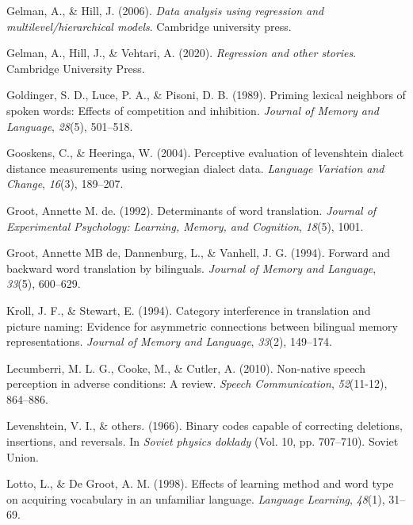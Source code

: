\documentclass[
  english,
  man,floatsintext]{apa6}
\newlength{\cslhangindent}
\newenvironment{CSLReferences}[2] %
 {%
  \setlength{\parindent}{0pt}
  \ifodd #1 \everypar{\setlength{\hangindent}{\cslhangindent}}\ignorespaces\fi
  \ifnum #2 > 0
  \setlength{\parskip}{#2\baselineskip}
  \fi
 }%
 {}
\begin{document}
\begin{CSLReferences}{1}{0}
\leavevmode{}%
Gelman, A., \& Hill, J. (2006). \emph{Data analysis using regression and multilevel/hierarchical models}. Cambridge university press.

\leavevmode{}%
Gelman, A., Hill, J., \& Vehtari, A. (2020). \emph{Regression and other stories}. Cambridge University Press.

\leavevmode{}%
Goldinger, S. D., Luce, P. A., \& Pisoni, D. B. (1989). Priming lexical neighbors of spoken words: Effects of competition and inhibition. \emph{Journal of Memory and Language}, \emph{28}(5), 501--518.

\leavevmode{}%
Gooskens, C., \& Heeringa, W. (2004). Perceptive evaluation of levenshtein dialect distance measurements using norwegian dialect data. \emph{Language Variation and Change}, \emph{16}(3), 189--207.

\leavevmode{}%
Groot, Annette M. de. (1992). Determinants of word translation. \emph{Journal of Experimental Psychology: Learning, Memory, and Cognition}, \emph{18}(5), 1001.

\leavevmode{}%
Groot, Annette MB de, Dannenburg, L., \& Vanhell, J. G. (1994). Forward and backward word translation by bilinguals. \emph{Journal of Memory and Language}, \emph{33}(5), 600--629.

\leavevmode{}%
Kroll, J. F., \& Stewart, E. (1994). Category interference in translation and picture naming: Evidence for asymmetric connections between bilingual memory representations. \emph{Journal of Memory and Language}, \emph{33}(2), 149--174.

\leavevmode{}%
Lecumberri, M. L. G., Cooke, M., \& Cutler, A. (2010). Non-native speech perception in adverse conditions: A review. \emph{Speech Communication}, \emph{52}(11-12), 864--886.

\leavevmode{}%
Levenshtein, V. I., \& others. (1966). Binary codes capable of correcting deletions, insertions, and reversals. In \emph{Soviet physics doklady} (Vol. 10, pp. 707--710). Soviet Union.

\leavevmode{}%
Lotto, L., \& De Groot, A. M. (1998). Effects of learning method and word type on acquiring vocabulary in an unfamiliar language. \emph{Language Learning}, \emph{48}(1), 31--69.


\end{CSLReferences}
\end{document}
